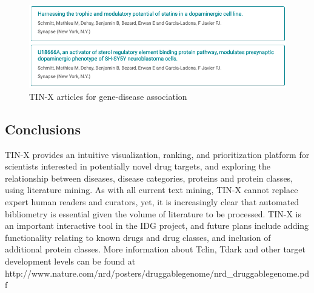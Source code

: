 \begin{figure}
    \centering
    \includegraphics[width=\linewidth]{figures/tinx/TINX_SYNRG3articles_rev2.png}
    \caption{TIN-X articles for gene-disease association}
    \label{fig:tinx_02}
\end{figure}

\subsection{Conclusions}

TIN-X provides an intuitive visualization, ranking, and prioritization platform for scientists interested in potentially novel drug targets, and exploring the relationship between diseases, disease categories, proteins and protein classes, using literature mining.  As with all current text mining, TIN-X cannot replace expert human readers and curators, yet, it is increasingly clear that automated bibliometry is essential given the volume of literature to be processed.  TIN-X is an important interactive tool in the IDG project, and future plans include adding functionality relating to known drugs and drug classes, and inclusion of additional protein classes. More information about Tclin, Tdark and other target development levels can be found at http://www.nature.com/nrd/posters/druggablegenome/nrd\_druggablegenome.pdf
